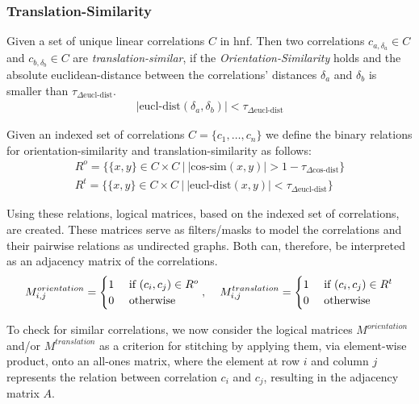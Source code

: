 \subsubsection*{Translation-Similarity}
Given a set of unique linear correlations $C$ in \gls{hnf}. Then two correlations $c_{a,\delta_a} \in C$ and $c_{b,\delta_b} \in C$ are \textit{translation-similar}, if the \textit{Orientation-Similarity} holds and the absolute euclidean-distance between the correlations' distances $\delta_a$ and $\delta_b$ is smaller than $\tau_{\Delta \text{eucl-dist}}$.
\begin{align}\label{eq:eucldist}
    |\text{eucl-dist}(\delta_a,\delta_b)| < \tau_{\Delta \text{eucl-dist}}
\end{align}

Given an indexed set of correlations $C=\{c_1,\dotsc,c_n\}$ we define the binary relations for orientation-similarity and translation-similarity as follows:
\begin{align}
    R^{o}=\{\{x,y\} \in C \times C\: \big|\: |\text{cos-sim}(x,y)| > 1-\tau_{\Delta \text{cos-dist}}\}\\
    R^{t}=\{\{x,y\} \in C \times C\: \big|\: |\text{eucl-dist}(x,y)| < \tau_{\Delta \text{eucl-dist}}\}
\end{align}

Using these relations, logical matrices, based on the indexed set of correlations, are created. These matrices serve as filters/masks to model the correlations and their pairwise relations as undirected graphs. Both can, therefore, be interpreted as an adjacency matrix of the correlations.
\begin{align}
    M^{orientation}_{i,j} = 
    \begin{cases}
        1 &\text{ if } (c_i,c_j) \in R^o\\
        0 &\text{ otherwise}
    \end{cases}, \textbf{\quad}
    M^{translation}_{i,j} = 
    \begin{cases}
        1 &\text{ if } (c_i,c_j) \in R^t\\
        0 &\text{ otherwise}
    \end{cases}
\end{align}

To check for similar correlations, we now consider the logical matrices $M^{orientation}$ and/or $M^{translation}$ as a criterion for stitching by applying them, via element-wise product, onto an all-ones matrix, where the element at row $i$ and column $j$ represents the relation between correlation $c_i$ and $c_j$, resulting in the adjacency matrix $A$. 

